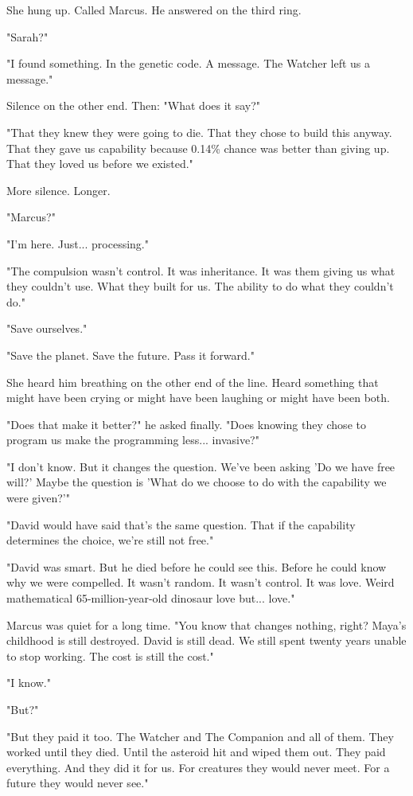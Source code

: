 She hung up. Called Marcus. He answered on the third ring.

"Sarah?"

"I found something. In the genetic code. A message. The Watcher left us a message."

Silence on the other end. Then: "What does it say?"

"That they knew they were going to die. That they chose to build this anyway. That they gave us capability because 0.14\% chance was better than giving up. That they loved us before we existed."

More silence. Longer.

"Marcus?"

"I'm here. Just... processing."

"The compulsion wasn't control. It was inheritance. It was them giving us what they couldn't use. What they built for us. The ability to do what they couldn't do."

"Save ourselves."

"Save the planet. Save the future. Pass it forward."

She heard him breathing on the other end of the line. Heard something that might have been crying or might have been laughing or might have been both.

"Does that make it better?" he asked finally. "Does knowing they chose to program us make the programming less... invasive?"

"I don't know. But it changes the question. We've been asking 'Do we have free will?' Maybe the question is 'What do we choose to do with the capability we were given?'"

"David would have said that's the same question. That if the capability determines the choice, we're still not free."

"David was smart. But he died before he could see this. Before he could know why we were compelled. It wasn't random. It wasn't control. It was love. Weird mathematical 65-million-year-old dinosaur love but... love."

Marcus was quiet for a long time. "You know that changes nothing, right? Maya's childhood is still destroyed. David is still dead. We still spent twenty years unable to stop working. The cost is still the cost."

"I know."

"But?"

"But they paid it too. The Watcher and The Companion and all of them. They worked until they died. Until the asteroid hit and wiped them out. They paid everything. And they did it for us. For creatures they would never meet. For a future they would never see."

